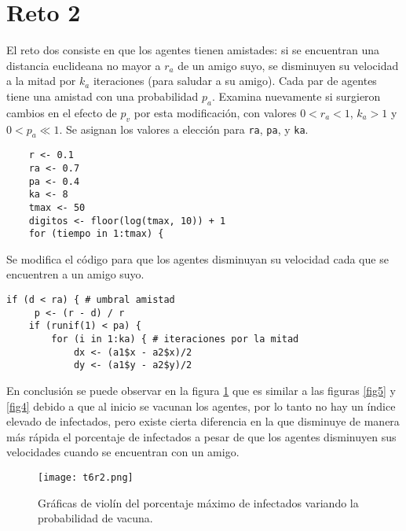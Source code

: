 \documentclass[12pt]{amsart}
\begin{document}
\section{Reto 2}
El reto dos consiste en que los agentes tienen amistades: si se encuentran una distancia euclideana no mayor a $r_a$ de un amigo suyo, se disminuyen su velocidad a la mitad por $k_a$ iteraciones (para saludar a su amigo). Cada par de agentes tiene una amistad con una probabilidad $p_a$. Examina nuevamente si surgieron cambios en el efecto de $p_v$ por esta modificación, con valores $0 < r_a < 1$, $k_a > 1$ y $0 < p_a \ll 1$.
Se asignan los valores a elección para \texttt{ra}, \texttt{pa}, y \texttt{ka}.
\renewcommand{\listingscaption}{Código}
\begin{listing}[H]
  \begin{verbatim}
    r <- 0.1
    ra <- 0.7
    pa <- 0.4
    ka <- 8
    tmax <- 50
    digitos <- floor(log(tmax, 10)) + 1
    for (tiempo in 1:tmax) {
  \end{verbatim}
  \label{codigo5}
\end{listing}

Se modifica el código para que los agentes disminuyan su velocidad cada que se encuentren a un amigo suyo.

\renewcommand{\listingscaption}{Código}
\begin{listing}[H]
  \begin{verbatim}
if (d < ra) { # umbral amistad
     p <- (r - d) / r
    if (runif(1) < pa) {
        for (i in 1:ka) { # iteraciones por la mitad
            dx <- (a1$x - a2$x)/2
            dy <- (a1$y - a2$y)/2
  \end{verbatim}
  \label{codigo5}
\end{listing}

En conclusión se puede observar en la figura \ref{fig6} que es similar a las figuras \ref{fig5} y \ref{fig4} debido a que al inicio se vacunan los agentes, por lo tanto no hay un índice elevado de infectados, pero existe cierta diferencia en la que disminuye de manera más rápida el porcentaje de infectados a pesar de que los agentes disminuyen sus velocidades cuando se encuentran con un amigo.
\begin{figure} [h!]
    \centering
    \texttt{[image: t6r2.png]}
    \caption{Gráficas de violín del porcentaje máximo de infectados variando la probabilidad de vacuna.}
    \label{fig6}
\end{figure}

\clearpage


\end{document}
